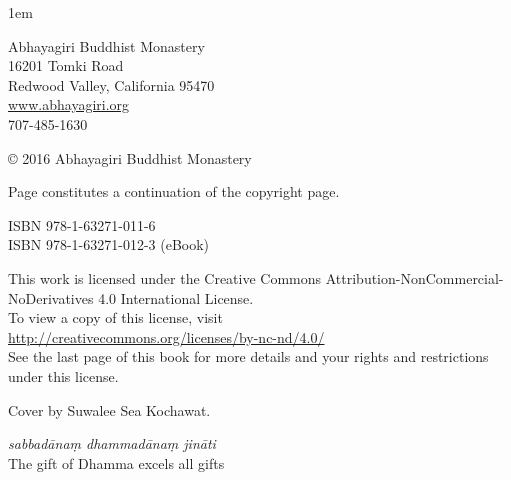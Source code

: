 \cleartoverso
\thispagestyle{empty}
{\raggedright\small
\parindent 0pt
\parskip 1em

Abhayagiri Buddhist Monastery\\
16201 Tomki Road\\
Redwood Valley, California 95470\\
\href{http://www.abhayagiri.org}{www.abhayagiri.org}\\
707-485-1630

© 2016 Abhayagiri Buddhist Monastery

Page \pageref{copyright-details} constitutes a continuation of the copyright page.

ISBN 978-1-63271-011-6\\
ISBN 978-1-63271-012-3 (eBook)

This work is licensed under the Creative Commons
Attribution-NonCommercial-NoDerivatives 4.0 International License.\\
To view a copy of this license, visit\\
\href{http://creativecommons.org/licenses/by-nc-nd/4.0}
{http://creativecommons.org/licenses/by-nc-nd/4.0/}\\[.5em]
See the last page of this book for more details and
your rights and restrictions under this license.

Cover by Suwalee Sea Kochawat.

\emph{sabbadānaṃ dhammadānaṃ jināti}\\
The gift of Dhamma excels all gifts

}
\clearpage